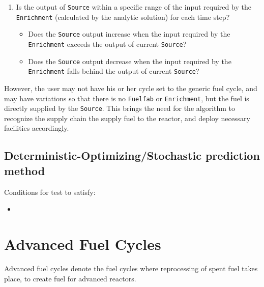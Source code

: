 \documentclass[12pt,letterpaper]{article}
\begin{document}
\begin{enumerate}
\item Is the output of \texttt{Source} within a specific range of the input required by the \texttt{Enrichment} (calculated by the analytic solution) for each time step? 
\begin{itemize}
\item Does the \texttt{Source} output increase when the input required by the \texttt{Enrichment} exceeds the output of current \texttt{Source}?
\item Does the \texttt{Source} output decrease when the input required by the \texttt{Enrichment} falls behind the output of current \texttt{Source}?
\end{itemize}


\end{enumerate}


However, the user may not have his or her cycle set to the generic fuel cycle, and may have
variations so that there is no \texttt{Fuelfab} or \texttt{Enrichment}, but the fuel is
directly supplied by the \texttt{Source}. This brings the need for the algorithm to recognize
the supply chain the supply fuel to the reactor, and deploy necessary facilities accordingly. 


\subsection{Deterministic-Optimizing/Stochastic prediction method}
Conditions for test to satisfy: 
\begin{itemize}
\item 
\end{itemize}



\section{Advanced Fuel Cycles}
Advanced fuel cycles denote the fuel cycles
where reprocessing of spent fuel takes place,
to create fuel for advanced reactors. 
\end{document}
